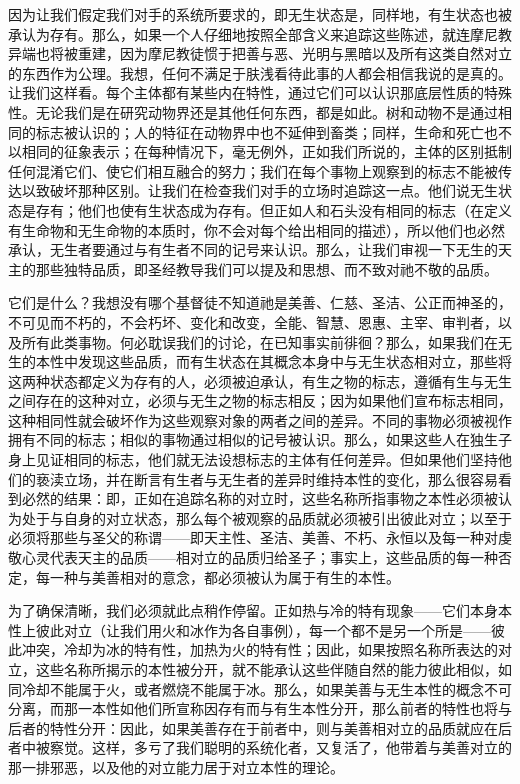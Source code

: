因为让我们假定我们对手的系统所要求的，即无生状态是，同样地，有生状态也被承认为存有。那么，如果一个人仔细地按照全部含义来追踪这些陈述，就连摩尼教异端也将被重建，因为摩尼教徒惯于把善与恶、光明与黑暗以及所有这类自然对立的东西作为公理。我想，任何不满足于肤浅看待此事的人都会相信我说的是真的。让我们这样看。每个主体都有某些内在特性，通过它们可以认识那底层性质的特殊性。无论我们是在研究动物界还是其他任何东西，都是如此。树和动物不是通过相同的标志被认识的；人的特征在动物界中也不延伸到畜类；同样，生命和死亡也不以相同的征象表示；在每种情况下，毫无例外，正如我们所说的，主体的区别抵制任何混淆它们、使它们相互融合的努力；我们在每个事物上观察到的标志不能被传达以致破坏那种区别。让我们在检查我们对手的立场时追踪这一点。他们说无生状态是存有；他们也使有生状态成为存有。但正如人和石头没有相同的标志（在定义有生命物和无生命物的本质时，你不会对每个给出相同的描述），所以他们也必然承认，无生者要通过与有生者不同的记号来认识。那么，让我们审视一下无生的天主的那些独特品质，即圣经教导我们可以提及和思想、而不致对祂不敬的品质。\par

它们是什么？我想没有哪个基督徒不知道祂是美善、仁慈、圣洁、公正而神圣的，不可见而不朽的，不会朽坏、变化和改变，全能、智慧、恩惠、主宰、审判者，以及所有此类事物。何必耽误我们的讨论，在已知事实前徘徊？那么，如果我们在无生的本性中发现这些品质，而有生状态在其概念本身中与无生状态相对立，那些将这两种状态都定义为存有的人，必须被迫承认，有生之物的标志，遵循有生与无生之间存在的这种对立，必须与无生之物的标志相反；因为如果他们宣布标志相同，这种相同性就会破坏作为这些观察对象的两者之间的差异。不同的事物必须被视作拥有不同的标志；相似的事物通过相似的记号被认识。那么，如果这些人在独生子身上见证相同的标志，他们就无法设想标志的主体有任何差异。但如果他们坚持他们的亵渎立场，并在断言有生者与无生者的差异时维持本性的变化，那么很容易看到必然的结果：即，正如在追踪名称的对立时，这些名称所指事物之本性必须被认为处于与自身的对立状态，那么每个被观察的品质就必须被引出彼此对立；以至于必须将那些与圣父的称谓——即天主性、圣洁、美善、不朽、永恒以及每一种对虔敬心灵代表天主的品质——相对立的品质归给圣子；事实上，这些品质的每一种否定，每一种与美善相对的意念，都必须被认为属于有生的本性。\par

为了确保清晰，我们必须就此点稍作停留。正如热与冷的特有现象——它们本身本性上彼此对立（让我们用火和冰作为各自事例），每一个都不是另一个所是——彼此冲突，冷却为冰的特有性，加热为火的特有性；因此，如果按照名称所表达的对立，这些名称所揭示的本性被分开，就不能承认这些伴随自然的能力彼此相似，如同冷却不能属于火，或者燃烧不能属于冰。那么，如果美善与无生本性的概念不可分离，而那一本性如他们所宣称因存有而与有生本性分开，那么前者的特性也将与后者的特性分开：因此，如果美善存在于前者中，则与美善相对立的品质就应在后者中被察觉。这样，多亏了我们聪明的系统化者，又复活了，他带着与美善对立的那一排邪恶，以及他的对立能力居于对立本性的理论。\par

